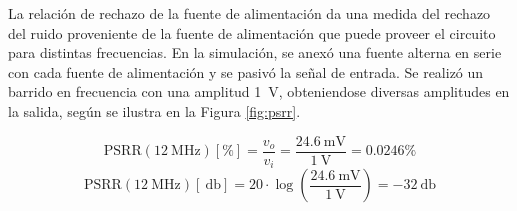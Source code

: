 La relación de rechazo de la fuente de alimentación da una medida del rechazo del ruido proveniente de la fuente de alimentación que puede proveer el circuito para distintas frecuencias. En la simulación, se anexó una fuente alterna en serie con cada fuente de alimentación y se pasivó la señal de entrada. Se realizó un barrido en frecuencia con una amplitud \SI{1}{\volt}, obteniendose diversas amplitudes en la salida, según se ilustra en la Figura \ref{fig:psrr}.



$$ \mathrm{PSRR}(\SI{12}{\mega\hertz}) [\%]= \frac{v_o}{v_i} = \frac{\SI{24.6}{\milli\volt}}{\SI{1}{\volt}} = \num{0,0246} \%$$
$$ \mathrm{PSRR}(\SI{12}{\mega\hertz}) [\SI{}{\decibel}] = 20 \cdot \log \left( \frac{\SI{24.6}{\milli\volt}}{\SI{1}{\volt}} \right) = \SI{-32}{\decibel} $$